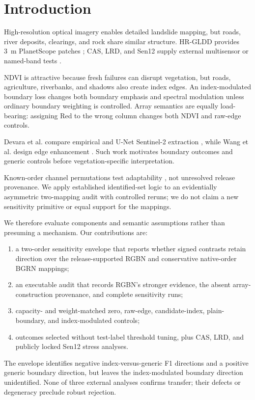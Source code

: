 \section{Introduction}
\label{sec:introduction}

High-resolution optical imagery enables detailed landslide mapping, but roads, river deposits, clearings, and rock share similar structure. HR-GLDD provides 3~m PlanetScope patches \citep{meena2023hrgldd}; CAS, LRD, and Sen12 supply external multisensor or named-band tests \citep{xu2024cas,orynbaikyzy2025lrd,hohn2025sen12}.

NDVI is attractive because fresh failures can disrupt vegetation, but roads, agriculture, riverbanks, and shadows also create index edges. An index-modulated boundary loss changes both boundary emphasis and spectral modulation unless ordinary boundary weighting is controlled. Array semantics are equally load-bearing: assigning Red to the wrong column changes both NDVI and raw-edge controls.

Devara et al. compare empirical and U-Net Sentinel-2 extraction \citep{devara2024landslide}, while Wang et al. design edge enhancement \citep{wang2025saeenet}. Such work motivates boundary outcomes and generic controls before vegetation-specific interpretation.

Known-order channel permutations test adaptability \citep{li2025bandadaptability}, not unresolved release provenance. We apply established identified-set logic to an evidentially asymmetric two-mapping audit with controlled reruns; we do not claim a new sensitivity primitive or equal support for the mappings.

We therefore evaluate components and semantic assumptions rather than presuming a mechanism. Our contributions are:
\begin{enumerate}
    \item a two-order sensitivity envelope that reports whether signed contrasts retain direction over the release-supported RGBN and conservative native-order BGRN mappings;
    \item an executable audit that records RGBN's stronger evidence, the absent array-construction provenance, and complete sensitivity runs;
    \item capacity- and weight-matched zero, raw-edge, candidate-index, plain-boundary, and index-modulated controls;
    \item outcomes selected without test-label threshold tuning, plus CAS, LRD, and publicly locked Sen12 stress analyses.
\end{enumerate}

The envelope identifies negative index-versus-generic F1 directions and a positive generic boundary direction, but leaves the index-modulated boundary direction unidentified. None of three external analyses confirms transfer; their defects or degeneracy preclude robust rejection.
